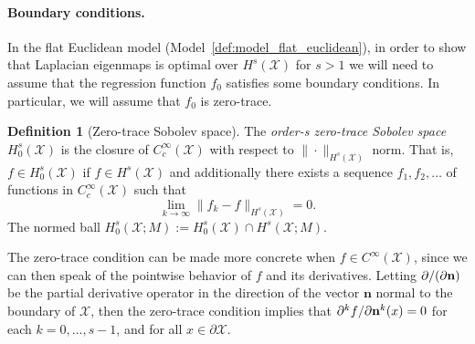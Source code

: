\documentclass{article}
\newcommand{\1}{\mathbf{1}}
\newcommand{\mc}[1]{\mathcal{#1}}
\theoremstyle{alden}
\theoremstyle{aldenthm}
\theoremstyle{definition}
\newtheorem{definition}{Definition}[section]
\theoremstyle{remark}
\begin{document}
%

\paragraph{Boundary conditions.}
In the flat Euclidean model (Model~\ref{def:model_flat_euclidean}), in order to show that Laplacian eigenmaps is optimal over $H^{s}(\mc{X})$ for $s > 1$ we will need to assume that the regression function $f_0$ satisfies some boundary conditions. In particular, we will assume that $f_0$ is zero-trace.
\begin{definition}[Zero-trace Sobolev space]
	\label{def:zero_trace_sobolev_space}
	The \emph{order-s zero-trace Sobolev space} $H_0^s(\mc{X})$ is the closure of $C_c^\infty(\mc{X})$ with respect to $\|\cdot\|_{H^s(\mc{X})}$ norm. That is, $f \in H_0^s(\mc{X})$ if $f \in H^s(\mc{X})$ and additionally there exists a sequence $f_1,f_2,\ldots$ of functions in $C_c^{\infty}(\mc{X})$ such that
	\begin{equation*}
	\lim_{k \to \infty}\|f_k - f\|_{H^s(\mc{X})} = 0.
	\end{equation*}
	The normed ball $H_0^{s}(\mc{X};M) := H_0^{s}(\mc{X}) \cap H^{s}(\mc{X};M)$.
\end{definition}
The zero-trace condition can be made more concrete when $f \in C^\infty(\mc{X})$, since we can then speak of the pointwise behavior of $f$ and its derivatives. Letting $\partial/(\partial {\bf n})$ be the partial derivative operator in the direction of the vector $\mathbf{n}$ normal to the boundary of $\mc{X}$, then the zero-trace condition implies that $\partial^{k}f/\partial{\bf n}^k(x) = 0$ for each $k = 0,\ldots,s - 1$, and for all $x \in \partial\mc{X}$.
\end{document}
